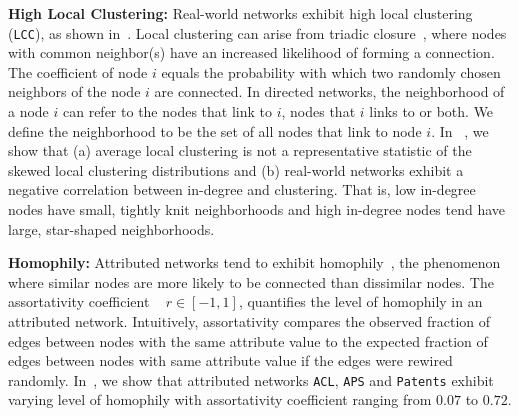 \textbf{High Local Clustering:}
Real-world networks exhibit high local clustering
(\texttt{LCC}), as shown in~. Local
clustering can arise from triadic closure~\cite{simmel1950sociology,
newman2001clustering}, where nodes with common neighbor(s) have an increased
likelihood of forming a connection.
The coefficient of node $i$ equals the probability with which two randomly chosen
neighbors of the node $i$ are connected. In directed networks, the neighborhood
of a node $i$ can refer to the nodes that link to $i$, nodes that
$i$ links to or both. We define the neighborhood to be the set
of all nodes that link to node $i$. In ~, we show that (a) average local clustering is not a
representative statistic of the skewed local clustering distributions and (b) real-world networks
exhibit a negative correlation between in-degree and clustering.
That is, low in-degree nodes have small, tightly knit neighborhoods
and high in-degree nodes tend have large, star-shaped neighborhoods.


\textbf{Homophily:}
Attributed networks tend to exhibit homophily~\cite{mcpherson2001birds}, the
phenomenon where similar nodes are more likely to be connected than dissimilar
nodes. The assortativity coefficient ~\cite{newman2002assortative} $r \in [-1,
1]$, quantifies the level of homophily in an attributed network.
Intuitively,
assortativity compares the observed fraction of edges between nodes with the same attribute
value to the expected fraction of edges between nodes with same attribute value
if the edges were rewired randomly. In~, we show that
attributed networks \texttt{ACL}, \texttt{APS} and \texttt{Patents} exhibit
varying level of homophily with assortativity coefficient ranging from $0.07$ to
$0.72$.


